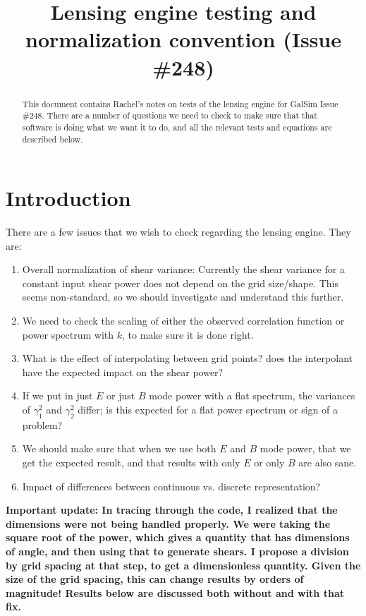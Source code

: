 \documentclass[preprint]{aastex}
\begin{document}
\title{Lensing engine testing and normalization convention (Issue \#248)}

\begin{abstract}
This document contains Rachel's notes on tests of the lensing engine
for GalSim Issue \#248.  There are a number of questions we need to
check to make sure that that software is doing what we want it to do,
and all the relevant tests and equations are described below.
\end{abstract}

\section{Introduction}

There are a few issues that we wish to check regarding the lensing
engine.  They are:

\begin{enumerate}
\item Overall normalization of shear variance: Currently the shear
  variance for a constant input shear power does not depend on
  the grid size/shape.  This seems non-standard, so we should
  investigate and understand this further.
\item We need to check the scaling of either the observed correlation
  function or power spectrum with $k$, to make sure it is done right.
\item What is the effect of interpolating between grid points?  does
  the interpolant have the expected impact on the shear power?
\item If we put in just $E$ or just $B$ mode power with a flat
  spectrum, the variances of $\gamma_1^2$ and $\gamma_2^2$ differ; is
  this expected for a flat power spectrum or sign of a problem?
\item We should make sure that when we use both $E$ and $B$ mode
  power, that we get the expected result, and that results with only
  $E$ or only $B$ are also sane.
\item Impact of differences between continuous vs. discrete
  representation?
\end{enumerate}

\textbf{Important update: In tracing through the code, I realized that
  the dimensions were not being handled properly. We were taking the
  square root of the power, which gives a quantity that has dimensions
  of angle, and then using that to generate shears.  I propose a
  division by grid spacing at that step, to get a dimensionless
  quantity.  Given the size of the grid spacing, this can
  change results by orders of magnitude!  Results below are discussed both without and with that fix.}
\end{document}
